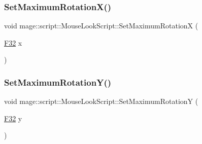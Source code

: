 \hypertarget{classmage_1_1script_1_1_mouse_look_script_a538d1d81ac4220a0e20e3e5de5c8e3a6}{}\label{classmage_1_1script_1_1_mouse_look_script_a538d1d81ac4220a0e20e3e5de5c8e3a6} 
\subsubsection{\texorpdfstring{Set\+Maximum\+Rotation\+X()}{SetMaximumRotationX()}}
{\footnotesize\ttfamily void mage\+::script\+::\+Mouse\+Look\+Script\+::\+Set\+Maximum\+RotationX (\begin{DoxyParamCaption}\item[{\hyperlink{namespacemage_aa97e833b45f06d60a0a9c4fc22ae02c0}{F32}}]{x }\end{DoxyParamCaption})\hspace{0.3cm}{\ttfamily [noexcept]}}

\hypertarget{classmage_1_1script_1_1_mouse_look_script_af56c4be26dde7497d53bb9f48d1b1a55}{}\label{classmage_1_1script_1_1_mouse_look_script_af56c4be26dde7497d53bb9f48d1b1a55} 
\subsubsection{\texorpdfstring{Set\+Maximum\+Rotation\+Y()}{SetMaximumRotationY()}}
{\footnotesize\ttfamily void mage\+::script\+::\+Mouse\+Look\+Script\+::\+Set\+Maximum\+RotationY (\begin{DoxyParamCaption}\item[{\hyperlink{namespacemage_aa97e833b45f06d60a0a9c4fc22ae02c0}{F32}}]{y }\end{DoxyParamCaption})\hspace{0.3cm}{\ttfamily [noexcept]}}

\hypertarget{classmage_1_1script_1_1_mouse_look_script_a6964af9c1c264be02c37671019ab117f}{}\label{classmage_1_1script_1_1_mouse_look_script_a6964af9c1c264be02c37671019ab117f} 
